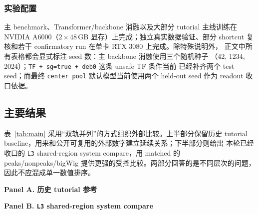 \documentclass[11pt,a4paper]{ctexart}
\begin{document}
\subsubsection{实验配置}

主 benchmark、Transformer/backbone 消融以及大部分 tutorial 主线训练在
NVIDIA A6000（$2 \times 48$\,GB 显存）上完成；独立真实数据验证、部分
shortcut 复核和若干 confirmatory run 在单卡 RTX 3080 上完成。除特殊说明外，
正文中所有表格都会显式标注 seed 数：主 backbone 消融使用三个随机种子
（42, 1234, 2024）；\texttt{TF + sg=true + deb0} 这条 unsafe TF 条件当前
已经补齐两个 test seed；而最终 \texttt{center pool} 默认模型当前使用两个
held-out seed 作为 readout 收口依据。

\subsection{主要结果}
\label{sec:main-result}

表~\ref{tab:main} 采用“双轨并列”的方式组织外部比较。上半部分保留历史
tutorial baseline，用来和公开可复用的外部数字建立延续关系；下半部分则给出
本轮已经收口的 \texttt{L3} shared-region system compare，用 matched 的
peaks/nonpeaks/bigWig 提供更强的受控比较。两部分回答的是不同层次的问题，
因此不应混成单一数值排序。

\begin{table}[H]
\centering
\small
\caption{TransChromBP 与 ChromBPNet 的双轨外部比较。Panel A 保留历史 tutorial
参考；Panel B 给出 matched 的 \texttt{L3} shared-region system compare。}
\label{tab:main}
\textbf{Panel A. 历史 tutorial 参考}\\[2mm]

\vspace{2mm}
\textbf{Panel B. \texttt{L3} shared-region system compare}\\[2mm]
\end{table}
\end{document}
